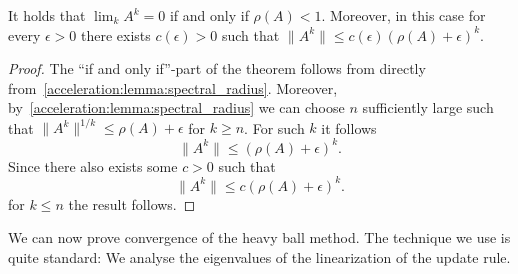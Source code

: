 \begin{cor}\label{acceleration:cor:spectral_radius}
    It holds that $\lim_k A^k=0$ if and only if $\rho(A)<1$. Moreover, in this case for every $\epsilon>0$ there exists $c(\epsilon)>0$ such that $\|A^k\|\leq c(\epsilon)(\rho(A)+\epsilon)^k$.
\end{cor}
\begin{proof}
    The \enquote{if and only if}-part of the theorem follows from directly from~\cref{acceleration:lemma:spectral_radius}.
    Moreover, by~\cref{acceleration:lemma:spectral_radius} we can choose $n$ sufficiently large such that $\|A^k\|^{1/k}\leq \rho(A) + \epsilon$ for $k\geq n$.
    For such $k$ it follows
    \begin{equation}
        \|A^k\|\leq (\rho(A)+\epsilon)^k.
    \end{equation}
    Since there also exists some $c>0$ such that 
    \begin{equation}
        \|A^k\|\leq c(\rho(A)+\epsilon)^k.
    \end{equation}
    for $k\leq n$ the result follows.
\end{proof}

We can now prove convergence of the heavy ball method. The technique we use is quite standard: We analyse the eigenvalues of the linearization of the update rule.

